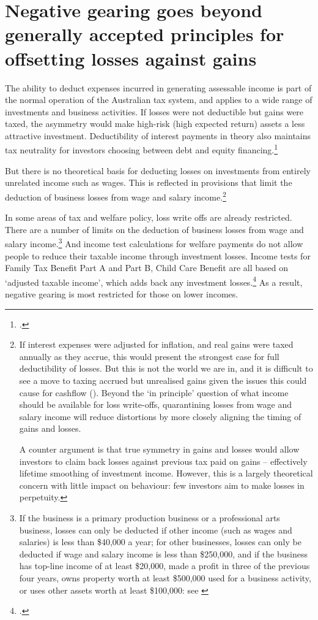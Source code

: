 \section{Negative gearing goes beyond generally accepted principles for offsetting losses against gains}\label{sec:NG-goes-beyond-accepted-principles-for-offsetting-losses}
The ability to deduct expenses incurred in generating assessable income is part of the normal operation of the Australian tax system, and applies to a wide range of investments and business activities. If losses were not deductible but gains were taxed, the asymmetry would make high-risk (high expected return) assets a less attractive investment. Deductibility of interest payments in theory also maintains tax neutrality for investors choosing between debt and equity financing.\footcite{FaneRichardson2004}   

But there is no theoretical basis for deducting losses on investments from entirely unrelated income such as wages. This is reflected in provisions that limit the deduction of business losses from wage and salary income.\footnote{If interest expenses were adjusted for inflation, and real gains were taxed annually as they accrue, this would present the strongest case for full deductibility of losses. But this is not the world we are in, and it is difficult to see a move to taxing accrued but unrealised gains given the issues this could cause for cashflow (). Beyond the ‘in principle’ question of what income should be available for loss write-offs, quarantining losses from wage and salary income will reduce distortions by more closely aligning the timing of gains and losses.

A counter argument is that true symmetry in gains and losses would allow investors to claim back losses against previous tax paid on gains -- effectively lifetime smoothing of investment income. However, this is a largely theoretical concern with little impact on behaviour: few investors aim to make losses in perpetuity.} 

In some areas of tax and welfare policy, loss write offs are already restricted. 
There are a number of limits on the deduction of business losses from wage and salary income.\footnote{If the business is a primary production business or a professional arts business, losses can only be deducted if other income (such as wages and salaries) is less than \$40,000 a year; for other businesses, losses can only be deducted if wage and salary income is less than \$250,000, and if the business has top-line income of at least \$20,000, made a profit in three of the previous four years, owns property worth at least \$500,000 used for a business activity, or uses other assets worth at least \$100,000: see \textcite{ATO2015OffsettingCurrentYearLosses}}
And income test calculations for welfare payments do not allow people to reduce their taxable income through investment losses. Income tests for Family Tax Benefit Part A and Part B, Child Care Benefit are all based on ‘adjusted taxable income’, which adds back any investment losses.\footcite{DHS2015AdjustedTaxableIncome} 
As a result, negative gearing is most restricted for those on lower incomes.

